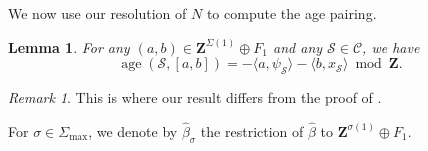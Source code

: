 \documentclass{proc-l}
\newcommand{\Z}{\mathbf{Z}}
\DeclareMathOperator{\age}{age}
\newcommand{\stackS}{\mathcal{S}}
\newtheorem{lemma}[theorem]{Lemma}
\theoremstyle{definition}
\theoremstyle{remark}
\newtheorem{remark}[theorem]{Remark}
\numberwithin{equation}{section}
\begin{document}
We now use our resolution of $N$ to compute the age pairing.

\begin{lemma}\label{lemma_appendix_computation_age_pairing}
For any $(a,b) \in \Z^{\Sigma(1)} \oplus F_1$ and any $\stackS \in \mathcal{C}$, we have
\[
\age\left( \stackS , [a,b] \right) = - \langle a , \psi_{\stackS} \rangle - \langle b , x_{\stackS} \rangle \bmod{\Z}.
\]
\end{lemma}

\begin{remark}
This is where our result differs from the proof of \cite[Proposition 21]{Coates_Corti_Iritani_Tseng_miror_theorem_toric_stack}.
\end{remark}

For $\sigma \in \Sigma_{\max}$, we denote by $\widehat{\beta}_{\sigma}$ the restriction of $\widehat{\beta}$ to $\Z^{\sigma(1)} \oplus F_1$.
\end{document}
